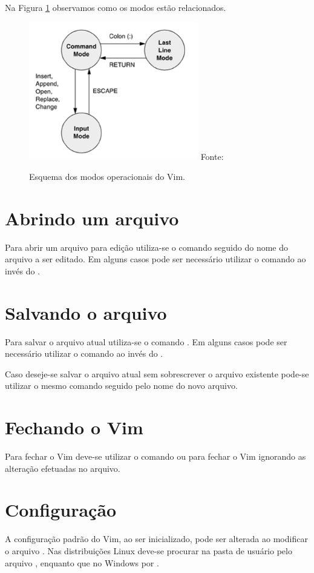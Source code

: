 Na Figura \ref{fig:vim_modes} observamos como os modos estão relacionados.
\begin{figure}[h!]
    \centering
    \includegraphics[height=6cm]{figures/vim_modes}
    Fonte: \cite{Sobell:2005:PracticalGuide}
    \caption{Esquema dos modos operacionais do Vim.}
    \label{fig:vim_modes}
\end{figure}

\section{Abrindo um arquivo}
Para abrir um arquivo para edição utiliza-se o comando  seguido do nome do arquivo a ser editado. Em alguns casos pode ser necessário utilizar o comando  ao invés do  .

\section{Salvando o arquivo}
Para salvar o arquivo atual utiliza-se o comando . Em alguns casos pode ser necessário utilizar o comando  ao invés do  .

Caso deseje-se salvar o arquivo atual sem sobrescrever o arquivo existente pode-se utilizar o mesmo comando seguido pelo nome do novo arquivo. 

\section{Fechando o Vim}
Para fechar o Vim deve-se utilizar o comando  ou  para fechar o Vim ignorando as alteração efetuadas no arquivo.

\section{Configuração}

A configuração padrão do Vim, ao ser inicializado, pode ser alterada ao modificar o arquivo . Nas distribuições Linux deve-se procurar na pasta de usuário pelo arquivo , enquanto que no Windows por .

